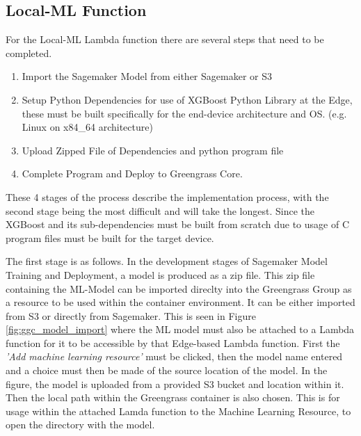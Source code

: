 \subsection{Local-ML Function}
For the Local-ML Lambda function there are several steps that need to be completed. \begin{enumerate}
    \item Import the Sagemaker Model from either Sagemaker or S3
    \item Setup Python Dependencies for use of XGBoost Python Library at the Edge, these must be built specifically for the end-device architecture and OS. (e.g. Linux on x84\_64 architecture)
    \item Upload Zipped File of Dependencies and python program file
    \item Complete Program and Deploy to Greengrass Core.
\end{enumerate}
These 4 stages of the process describe the implementation process, with the second stage being the most difficult and will take the longest. Since the XGBoost and its sub-dependencies must be built from scratch due to usage of C program files must be built for the target device. 



The first stage is as follows. In the development stages of Sagemaker Model Training and Deployment, a model is produced as a zip file. This zip file containing the ML-Model can be imported direclty into the Greengrass Group as a resource to be used within the container environment. It can be either imported from S3 or directly from Sagemaker. This is seen in Figure \ref{fig:ggc_model_import} where the ML model must also be attached to a Lambda function for it to be accessible by that Edge-based Lambda function. First the \textit{'Add machine learning resource'} must be clicked, then the model name entered and a choice must then be made of the source location of the model. In the figure, the model is uploaded from a provided S3 bucket and location within it. Then the local path within the Greengrass container is also chosen. This is for usage within the attached Lamda function to the Machine Learning Resource, to open the directory with the model.

